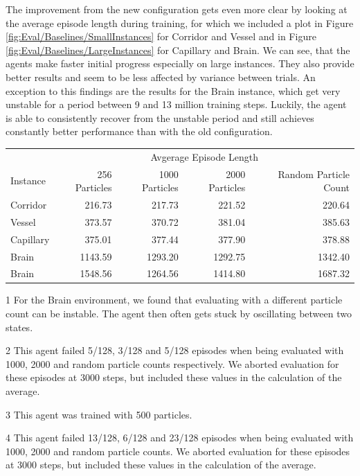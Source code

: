The improvement from the new configuration gets even more clear by looking at the average episode length during training, for which we included a plot in Figure \ref{fig:Eval/Baselines/SmallInstances} for Corridor and Vessel and in Figure \ref{fig:Eval/Baselines/LargeInstances} for Capillary and Brain. We can see, that the agents make faster initial progress especially on large instances. They also provide better results and seem to be less affected by variance between trials. An exception to this findings are the results for the Brain instance, which get very unstable for a period between 9 and 13 million training steps. Luckily, the agent is able to consistently recover from the unstable period and still achieves constantly better performance than with the old configuration.

\begin{table} [htp]
    \begin{center}
        \begin{threeparttable}
            \begin{tabular}{lrrrr}
                \toprule
                & \multicolumn{4}{c}{Avgerage Episode Length} \\
                \cmidrule(lr){2-5}
                Instance & 256 Particles & 1000 Particles & 2000 Particles & Random Particle Count  \\
                \midrule
                Corridor & 216.73 & 217.73 & 221.52 & 220.64  \\
                Vessel & 373.57 & 370.72 & 381.04 & 385.63 \\
                Capillary & 375.01 & 377.44 & 377.90 & 378.88 \\
                Brain\tnote{1} & 1143.59 & 1293.20\tnote{2} & 1292.75\tnote{2} & 1342.40\tnote{2} \\
                \midrule
                Brain\tnote{3} & 1548.56\tnote{4} & 1264.56 & 1414.80\tnote{4} & 1687.32\tnote{4} \\
                \bottomrule
            \end{tabular}
            \begin{tablenotes}
                \footnotesize
                \item [1] For the Brain environment, we found that evaluating with a different particle count can be instable. The agent then often gets stuck by oscillating between two states.
                \item[2] This agent failed 5/128, 3/128 and 5/128 episodes when being evaluated with 1000, 2000 and random particle counts respectively. We aborted evaluation for these episodes at 3000 steps, but included these values in the calculation of the average.
                \item[3] This agent was trained with 500 particles.
                \item[4] This agent failed 13/128, 6/128 and 23/128 episodes when being evaluated with 1000, 2000 and random particle counts. We aborted evaluation for these episodes at 3000 steps, but included these values in the calculation of the average.
            \end{tablenotes}


\end{threeparttable}
\end{center}
\end{table}
